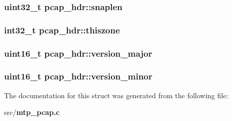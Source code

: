 \subsubsection[{snaplen}]{\setlength{\rightskip}{0pt plus 5cm}uint32\+\_\+t pcap\+\_\+hdr\+::snaplen}\label{structpcap__hdr_aeee4aa5436470b094c238ecea4c95a50}
\subsubsection[{thiszone}]{\setlength{\rightskip}{0pt plus 5cm}int32\+\_\+t pcap\+\_\+hdr\+::thiszone}\label{structpcap__hdr_a1c0c50802df0a3eb89dec3cd4fbd155e}
\subsubsection[{version\+\_\+major}]{\setlength{\rightskip}{0pt plus 5cm}uint16\+\_\+t pcap\+\_\+hdr\+::version\+\_\+major}\label{structpcap__hdr_a0059899d7ebce5395b1f56f7d54f9b0c}
\subsubsection[{version\+\_\+minor}]{\setlength{\rightskip}{0pt plus 5cm}uint16\+\_\+t pcap\+\_\+hdr\+::version\+\_\+minor}\label{structpcap__hdr_a2b5610d5e1155508f6363d5924612bf1}


The documentation for this struct was generated from the following file\+:\begin{DoxyCompactItemize}
\item 
src/{\bf mtp\+\_\+pcap.\+c}\end{DoxyCompactItemize}
